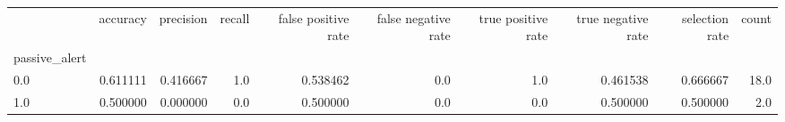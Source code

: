 \begin{tabular}{lrrrrrrrrr}
\toprule
{} &  accuracy &  precision &  recall &  false positive rate &  false negative rate &  true positive rate &  true negative rate &  selection rate &  count \\
passive\_alert &           &            &         &                      &                      &                     &                     &                 &        \\
\midrule
0.0           &  0.611111 &   0.416667 &     1.0 &             0.538462 &                  0.0 &                 1.0 &            0.461538 &        0.666667 &   18.0 \\
1.0           &  0.500000 &   0.000000 &     0.0 &             0.500000 &                  0.0 &                 0.0 &            0.500000 &        0.500000 &    2.0 \\
\bottomrule
\end{tabular}
